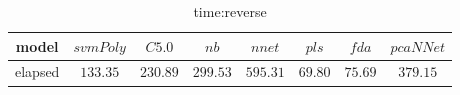 \begin{table}[!ht]
	\centering
	\begin{tabular}{|c|c|c|c|c|c|c|c|}
		\hline
		model & $svmPoly$ & $C5.0$ & $nb$ & $nnet$ & $pls$ & $fda$ & $pcaNNet$ \\ \hline
		elapsed & $133.35$ & $230.89$ & $299.53$ & $595.31$ & $69.80$ & $75.69$ & $379.15$ \\ \hline
	\end{tabular}
	\caption{time:reverse}
	\label{tab:time:reverse}
\end{table}
